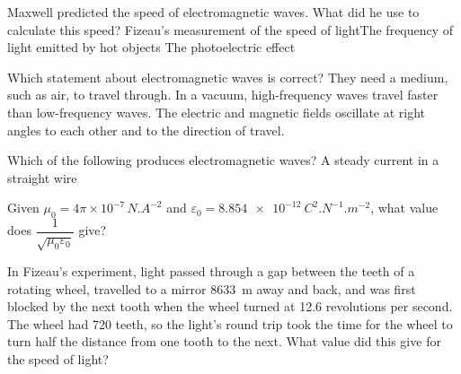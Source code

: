 
\begin{quizq}{}
Maxwell predicted the speed of electromagnetic waves. What did he use to calculate this speed?
  {Fizeau's measurement of the speed of light}{The frequency of light emitted by hot objects}
  {The photoelectric effect}
\end{quizq}

\begin{quizq}{}
Which statement about electromagnetic waves is correct?
  {They need a medium, such as air, to travel through.}
  {In a vacuum, high-frequency waves travel faster than low-frequency waves.}
  {The electric and magnetic fields oscillate at right angles to each other and to the direction of
   travel.}
\end{quizq}

\begin{quizq}{}
Which of the following produces electromagnetic waves?
  {A steady current in a straight wire}
\end{quizq}

\begin{quizq}{}
Given $\mu_0 = 4\pi \times 10^{-7}\,\si{N.A^{-2}}$ and $\varepsilon_0 = \qty{8.854e-12}{C^2.N^{-1}.m^{-2}}$,
what value does $\dfrac{1}{\sqrt{\mu_0\varepsilon_0}}$ give?
\end{quizq}

\begin{quizq}{}
In Fizeau's experiment, light passed through a gap between the teeth of a rotating wheel, travelled to a
mirror \qty{8633}{m} away and back, and was first blocked by the next tooth when the wheel turned at
12.6 revolutions per second. The wheel had 720 teeth, so the light's round trip took the time for the
wheel to turn half the distance from one tooth to the next. What value did this give for the speed of
light?
\end{quizq}

